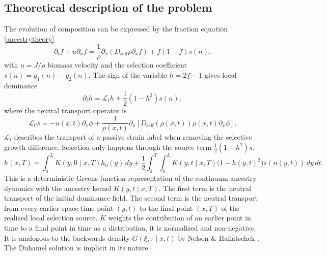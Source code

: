 \documentclass[11pt,a4paper]{report}
\newcommand{\Dself}{D_{\mathrm{self}}}
\newcommand{\pd}{\partial}
\newcommand{\Lop}{\mathcal L}
\begin{document}
	\subsection{Theoretical description of the problem}	
	The evolution of composition can be expressed by the fraction equation \ref{ancestrytheory}
	\begin{equation}
		{
			\pd_t f+u\pd_xf
			=\frac1\rho\pd_x(\Dself\rho\pd_xf)+f(1-f)s(n).
		}
		\label{eq:f-equation}
	\end{equation}	
	with $u=J/\rho$ biomass velocity and the selection coefficient $s(n) = g_1(n)-g_2(n)$. The sign of the variable \(h=2f-1\) gives local dominance
	\begin{equation}
		{
			\pd_t h=\Lop_t h+\frac12(1-h^2)s(n),
		}
		\label{eq:h-equation}
	\end{equation}
	where the neutral transport operator is
	\begin{equation}
		{
			\Lop_t\phi=-u(x,t)\pd_x\phi+\frac1{\rho(x,t)}
			\pd_x\left[\Dself(\rho(x,t))\rho(x,t)\pd_x\phi\right].
		}
		\label{eq:Lop}
	\end{equation}
	\(\Lop_t\) describes the transport of a passive strain label when removing the selective growth difference. Selection only happens through the source term \(\frac12(1-h^2)s\).
	\begin{equation}
		{
			h(x,T)
			=
			\int_0^L K(y,0\mid x,T)h_0(y)\,dy
			+
			\frac12
			\int_0^T\int_0^L
			K(y,t\mid x,T)
			\bigl(1-h(y,t)^2\bigr)s(n(y,t))\,dy\,dt .
		}
		\label{eq:duhamel-kernel2}
	\end{equation}
	This is a deterministic Greens function representation of the continuum ancestry dynamics with the ancestry kernel $K(y,t\mid x,T)$. The first term is the neutral transport of the initial dominance field. The second term
	is the neutral transport from every earlier space time point \((y,t)\) to the
	final point \((x,T)\) of the realized local selection source. $K$ weights the contribution of an earlier point in time to a final point in time as a distribution, it is normalized and non-negative. It is analogous to the backwards density $G(\xi,\tau\mid x,t)$ by Nelson \& Hallatschek \cite{gene, lifeexp}. The Duhamel solution is implicit in its nature.
\end{document}
